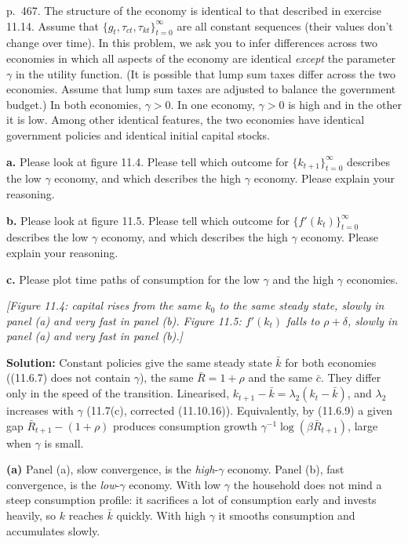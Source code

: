 \documentclass[12pt, letterpaper]{article}
\newcommand{\Rb}{\bar R}
\newcommand{\kb}{\bar k}
\newcommand{\cb}{\bar c}
\begin{document}
\begin{tcolorbox}[evenbox,title={Exercise 11.16 \quad High and low $\gamma$}]
\begin{tcolorbox}[questionbox]
p.~467. The structure of the economy is identical to that described in exercise 11.14. Assume that
$\{g_t,\tau_{ct},\tau_{kt}\}_{t=0}^\infty$ are all constant sequences (their values don't change over time). In this
problem, we ask you to infer differences across two economies in which all aspects of the economy are identical
\emph{except} the parameter $\gamma$ in the utility function. (It is possible that lump sum taxes differ across the two
economies. Assume that lump sum taxes are adjusted to balance the government budget.) In both economies, $\gamma>0$. In one
economy, $\gamma>0$ is high and in the other it is low. Among other identical features, the two economies have identical
government policies and identical initial capital stocks.

\textbf{a.} Please look at figure 11.4. Please tell which outcome for $\{k_{t+1}\}_{t=0}^\infty$ describes the low
$\gamma$ economy, and which describes the high $\gamma$ economy. Please explain your reasoning.

\textbf{b.} Please look at figure 11.5. Please tell which outcome for $\{f'(k_t)\}_{t=0}^\infty$ describes the low
$\gamma$ economy, and which describes the high $\gamma$ economy. Please explain your reasoning.

\textbf{c.} Please plot time paths of consumption for the low $\gamma$ and the high $\gamma$ economies.

\smallskip
\emph{[Figure 11.4: capital rises from the same $k_0$ to the same steady state, slowly in panel (a) and very fast in panel
(b). Figure 11.5: $f'(k_t)$ falls to $\rho+\delta$, slowly in panel (a) and very fast in panel (b).]}
\end{tcolorbox}

\textbf{Solution:} Constant policies give the same steady state $\kb$ for both economies ((11.6.7) does not contain
$\gamma$), the same $\Rb=1+\rho$ and the same $\cb$. They differ only in the speed of the transition. Linearised,
$k_{t+1}-\kb=\lambda_2(k_t-\kb)$, and $\lambda_2$ increases with $\gamma$ (11.7(c), corrected (11.10.16)). Equivalently,
by (11.6.9) a given gap $\Rb_{t+1}-(1+\rho)$ produces consumption growth $\gamma^{-1}\log(\beta\Rb_{t+1})$, large when
$\gamma$ is small.

\textbf{(a)} Panel (a), slow convergence, is the \emph{high}-$\gamma$ economy. Panel (b), fast convergence, is the
\emph{low}-$\gamma$ economy. With low $\gamma$ the household does not mind a steep consumption profile: it sacrifices a lot of
consumption early and invests heavily, so $k$ reaches $\kb$ quickly. With high $\gamma$ it smooths consumption and
accumulates slowly.


\end{tcolorbox}
\end{document}
